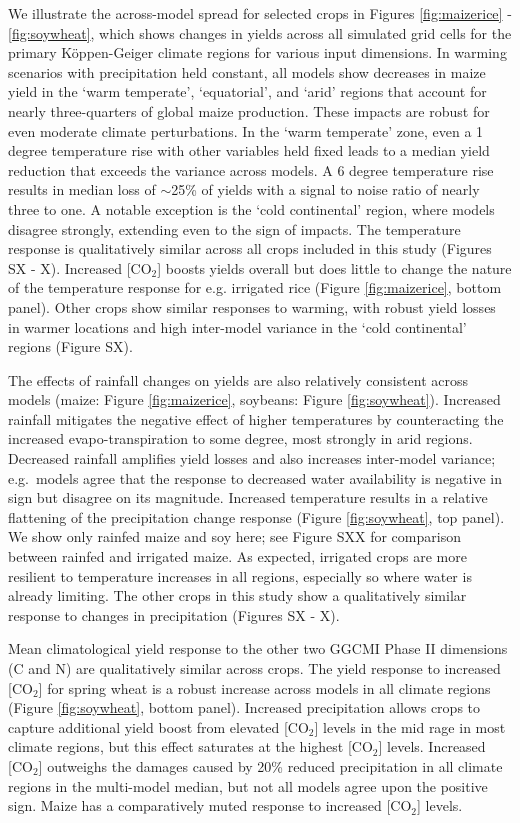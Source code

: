 \documentclass[gmd, manuscript]{copernicus} %
\begin{document}
We illustrate the across-model spread for selected crops in Figures \ref{fig:maizerice} - \ref{fig:soywheat}, which shows changes in yields across all simulated grid cells for the primary K\"{o}ppen-Geiger climate regions \citep{rubel2010} for various input dimensions.
In warming scenarios with precipitation held constant, all models show decreases in maize yield in the `warm temperate', `equatorial', and `arid' regions that account for nearly three-quarters of global maize production. 
These impacts are robust for even moderate climate perturbations.
In the `warm temperate' zone, even a 1 degree temperature rise with other variables held fixed leads to a median yield reduction that exceeds the variance across models. 
A 6 degree temperature rise results in median loss of $\sim$25\% of yields with a signal to noise ratio of nearly three to one. A notable exception is the `cold continental' region, where models disagree strongly, extending even to the sign of impacts. 
The temperature response is qualitatively similar across all crops included in this study (Figures SX - X).
Increased [CO$_2$] boosts yields overall but does little to change the nature of the temperature response for e.g. irrigated rice (Figure \ref{fig:maizerice}, bottom panel).
Other crops show similar responses to warming, with robust yield losses in warmer locations and high inter-model variance in the `cold continental' regions (Figure SX).

The effects of rainfall changes on yields are also relatively consistent across models (maize: Figure \ref{fig:maizerice}, soybeans: Figure \ref{fig:soywheat}). 
Increased rainfall mitigates the negative effect of higher temperatures by counteracting the increased evapo-transpiration to some degree, most strongly in arid regions.
Decreased rainfall amplifies yield losses and also increases inter-model variance; e.g.\ models agree that the response to decreased water availability is negative in sign but disagree on its magnitude.
Increased temperature results in a relative flattening of the precipitation change response (Figure \ref{fig:soywheat}, top panel).
We show only rainfed maize and soy here; see Figure SXX for comparison between rainfed and irrigated maize. 
As expected, irrigated crops are more resilient to temperature increases in all regions, especially so where water is already limiting. 
The other crops in this study show a qualitatively similar response to changes in precipitation (Figures SX - X).  

Mean climatological yield response to the other two GGCMI Phase II dimensions (C and N) are qualitatively similar across crops. 
The yield response to increased [CO$_2$] for spring wheat is a robust increase across models in all climate regions (Figure \ref{fig:soywheat}, bottom panel). 
Increased precipitation allows crops to capture additional yield boost from elevated [CO$_2$] levels in the mid rage in most climate regions, but this effect saturates at the highest [CO$_2$] levels. 
Increased [CO$_2$] outweighs the damages caused by 20\% reduced precipitation in all climate regions in the multi-model median, but not all models agree upon the positive sign.
Maize has a comparatively muted response to increased [CO$_2$] levels. 
\end{document}
